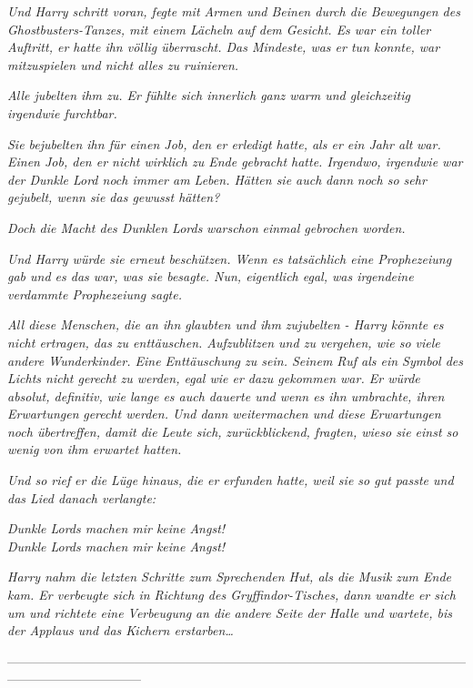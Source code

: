 {\emph{Und Harry schritt voran, fegte mit Armen und Beinen durch die Bewegungen des Ghostbusters-Tanzes, mit einem Lächeln auf dem Gesicht. Es war ein toller Auftritt, er hatte ihn völlig überrascht. Das Mindeste, was er tun konnte, war mitzuspielen und nicht alles zu ruinieren.}

\emph{Alle jubelten ihm zu. Er fühlte sich innerlich ganz warm und gleichzeitig irgendwie furchtbar.}

\emph{Sie bejubelten ihn für einen Job, den er erledigt hatte, als er ein Jahr alt} \emph{war. Einen Job, den er nicht wirklich zu Ende gebracht hatte. Irgendwo, irgendwie war der Dunkle Lord noch immer am Leben. Hätten sie auch} \emph{dann} \emph{noch so sehr gejubelt, wenn sie das gewusst hätten?}

\emph{Doch die Macht des Dunklen Lords} \emph{\emph{war}schon} \emph{einmal gebrochen worden.}

\emph{Und Harry würde sie erneut beschützen. Wenn es tatsächlich eine Prophezeiung gab und es das war, was sie besagte. Nun, eigentlich egal, was irgendeine verdammte Prophezeiung sagte.}

\emph{All diese Menschen, die an ihn glaubten und ihm zujubelten - Harry könnte es nicht ertragen, das zu enttäuschen. Aufzublitzen und zu vergehen, wie so viele andere Wunderkinder. Eine Enttäuschung zu sein. Seinem Ruf als ein Symbol des Lichts nicht gerecht zu werden, egal wie er dazu gekommen war. Er würde absolut, definitiv, wie lange es auch dauerte und wenn es ihn umbrachte, ihren} \emph{Erwartungen} \emph{gerecht werden. Und dann} \emph{weitermachen und} \emph{diese Erwartungen noch übertreffen, damit die Leute sich,} \emph{zurückblickend, fragten, wieso sie einst so wenig von ihm erwartet hatten.}

\emph{Und so rief} \emph{er die} \emph{Lüge hinaus, die er erfunden hatte, weil sie so gut passte und das Lied danach verlangte:}

\emph{\emph{Dunkle Lords machen mir keine Angst!}\\ \emph{Dunkle Lords machen mir keine Angst!}}

\emph{Harry nahm die letzten Schritte zum Sprechenden Hut, als die Musik zum Ende kam. Er verbeugte sich in Richtung des Gryffindor-Tisches, dann wandte er sich um und richtete eine Verbeugung} \emph{an die} \emph{andere Seite der Halle und wartete, bis der Applaus und das Kichern erstarben…}

--------------------------------------------------------------------------------------------------------------------------------------------

}
